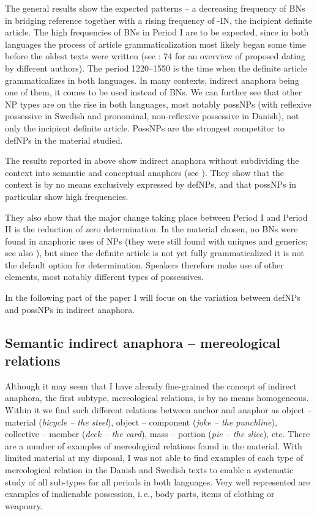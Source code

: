 \documentclass[output=paper]{langsci/langscibook}
\begin{document}
The general results show the expected patterns -- a decreasing frequency of BNs in bridging reference together with a rising frequency of -IN, the incipient definite article. The high frequencies of BNs in Period I are to be expected, since in both languages the process of article grammaticalization most likely began some time before the oldest texts were written (see \citealt{skrzypek:12}: 74 for an overview of proposed dating by different authors). The period 1220--1550 is the time when the definite article grammaticalizes in both languages. In many contexts, indirect anaphora being one of them, it comes to be used instead of BNs. We can further see that other NP types are on the rise in both languages, most notably possNPs (with reflexive possessive in Swedish and pronominal, non-reflexive possessive in Danish), not only the incipient definite article. PossNPs are the strongest competitor to defNPs in the material studied. 

The results reported in  above show indirect anaphora without subdividing the context into semantic and conceptual anaphors (see ). They show that the context is by no means exclusively expressed by defNPs, and that possNPs in particular show high frequencies.

They also show that the major change taking place between Period I and Period II is the reduction of zero determination. In the material chosen, no BNs were found in anaphoric uses of NPs (they were still found with uniques and generics; see also \citealt{skrzypek:12}), but since the definite article is not yet fully grammaticalized it is not the default option for determination. Speakers therefore make use of other elements, most notably different types of possessives. 

In the following part of the paper I will focus on the variation between defNPs and possNPs in indirect anaphora.


\subsection{Semantic indirect anaphora -- mereological relations}\label{6sec:41}

Although it may seem that I have already fine-grained the concept of indirect anaphora, the first subtype, mereological relations, is by no means homogeneous. Within it we find such different relations between anchor and anaphor as object -- material ({\emph{bicycle -- the steel}}), object -- component ({\emph{joke -- the punchline}}), collective -- member ({\emph{deck -- the card}}), mass -- portion ({\emph{pie -- the slice}}), etc. There are a number of examples of mereological relations found in the material. With limited material at my disposal, I was not able to find examples of each type of mereological relation in the Danish and Swedish texts to enable a systematic study of all sub-types for all periods in both languages. Very well represented are examples of inalienable possession, i.\,e., body parts, items of clothing or weaponry. 
\end{document}
